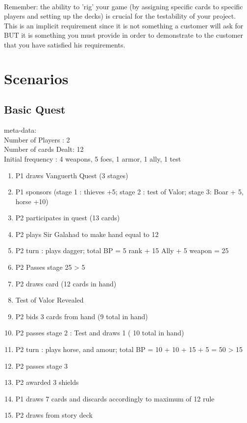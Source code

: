 \documentclass[a4paper,11pt]{article}
\begin{document}
\paragraph{}
Remember: the ability to 'rig' your game (by assigning specific cards to specific players and setting up the decks) is crucial for the testability of your project. This is an implicit requirement since it is not something a customer will ask for BUT it is something you must provide in order to demonstrate to the customer that you have satisfied his requirements.

\section{Scenarios}

\subsection{Basic Quest}
meta-data:\\
Number of Players : 2\\
Number of cards Dealt: 12\\
Initial frequency : 4 weapons, 5 foes, 1 armor, 1 ally, 1 test\\
\begin{enumerate}
	\item P1 draws Vanguerth Quest (3 stages)
	\item P1 sponsors (stage 1 : thieves +5; stage 2 : test of Valor; stage 3: Boar + 5, horse +10)
	\item P2 participates in quest (13 cards)
	\item P2 plays Sir Galahad to make hand equal to 12
	\item P2 turn : plays dagger; total BP =  5 rank + 15 Ally + 5 weapon = 25
	\item P2 Passes stage 25 > 5
	\item P2 draws card (12 cards in hand)
	\item Test of Valor Revealed 
	\item P2 bids 3 cards from hand (9 total in hand)
	\item P2 passes stage 2 : Test and draws 1 ( 10 total in hand)
	\item P2 turn : plays horse, and amour; total BP = 10 + 10 + 15 + 5 = 50 > 15
	\item P2 passes stage 3
	\item P2 awarded 3 shields
	\item P1 draws 7 cards and discards accordingly to  maximum of 12 rule
	\item P2 draws from story deck
\end{enumerate}
\end{document}
